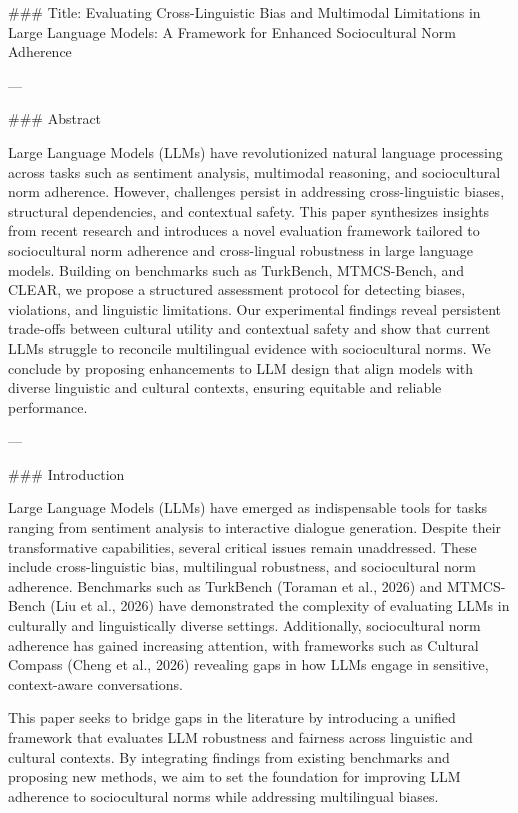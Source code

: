 ### Title: Evaluating Cross-Linguistic Bias and Multimodal Limitations in Large Language Models: A Framework for Enhanced Sociocultural Norm Adherence

---

### Abstract

Large Language Models (LLMs) have revolutionized natural language processing across tasks such as sentiment analysis, multimodal reasoning, and sociocultural norm adherence. However, challenges persist in addressing cross-linguistic biases, structural dependencies, and contextual safety. This paper synthesizes insights from recent research and introduces a novel evaluation framework tailored to sociocultural norm adherence and cross-lingual robustness in large language models. Building on benchmarks such as TurkBench, MTMCS-Bench, and CLEAR, we propose a structured assessment protocol for detecting biases, violations, and linguistic limitations. Our experimental findings reveal persistent trade-offs between cultural utility and contextual safety and show that current LLMs struggle to reconcile multilingual evidence with sociocultural norms. We conclude by proposing enhancements to LLM design that align models with diverse linguistic and cultural contexts, ensuring equitable and reliable performance.

---

### Introduction

Large Language Models (LLMs) have emerged as indispensable tools for tasks ranging from sentiment analysis to interactive dialogue generation. Despite their transformative capabilities, several critical issues remain unaddressed. These include cross-linguistic bias, multilingual robustness, and sociocultural norm adherence. Benchmarks such as TurkBench (Toraman et al., 2026) and MTMCS-Bench (Liu et al., 2026) have demonstrated the complexity of evaluating LLMs in culturally and linguistically diverse settings. Additionally, sociocultural norm adherence has gained increasing attention, with frameworks such as Cultural Compass (Cheng et al., 2026) revealing gaps in how LLMs engage in sensitive, context-aware conversations.

This paper seeks to bridge gaps in the literature by introducing a unified framework that evaluates LLM robustness and fairness across linguistic and cultural contexts. By integrating findings from existing benchmarks and proposing new methods, we aim to set the foundation for improving LLM adherence to sociocultural norms while addressing multilingual biases.


